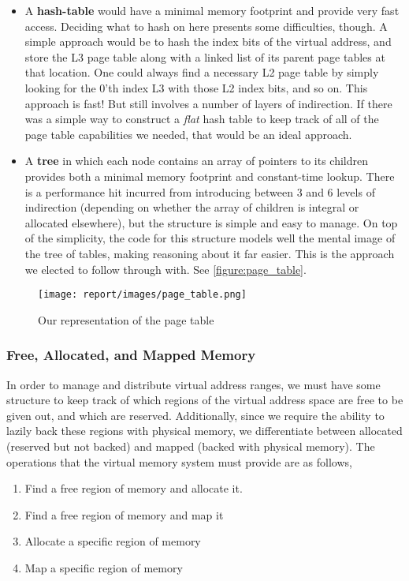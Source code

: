 \begin{itemize}
\item A \textbf{hash-table} would have a minimal memory footprint and provide very fast access. Deciding what to hash on here presents some difficulties, though. A simple approach would be to hash the index bits of the virtual address, and store the L3 page table along with a linked list of its parent page tables at that location. One could always find a necessary L2 page table by simply looking for the 0'th index L3 with those L2 index bits, and so on. This approach is fast! But still involves a number of layers of indirection. If there was a simple way to construct a \textit{flat} hash table to keep track of all of the page table capabilities we needed, that would be an ideal approach.

\item A \textbf{tree }in which each node contains an array of pointers to its children provides both a minimal memory footprint and constant-time lookup. There is a performance hit incurred from introducing between 3 and 6 levels of indirection (depending on whether the array of children is integral or allocated elsewhere), but the structure is simple and easy to manage. On top of the simplicity, the code for this structure models well the mental image of the tree of tables, making reasoning about it far easier. This is the approach we elected to follow through with. See \autoref{figure:page_table}.
\end{itemize}

\begin{figure}[h]
	\texttt{[image: report/images/page\_table.png]}
	\caption{Our representation of the page table}
	\label{figure:page_table}
	\centering
\end{figure}

\subsubsection*{Free, Allocated, and Mapped Memory}

In order to manage and distribute virtual address ranges, we must have some structure to keep track of which regions of the virtual address space are free to be given out, and which are reserved. Additionally, since we require the ability to lazily back these regions with physical memory, we differentiate between allocated (reserved but not backed) and mapped (backed with physical memory). The operations that the virtual memory system must provide are as follows,
\begin{enumerate}
    \item Find a free region of memory and allocate it.
    \item Find a free region of memory and map it
    \item Allocate a specific region of memory
    \item Map a specific region of memory
\end{enumerate}

